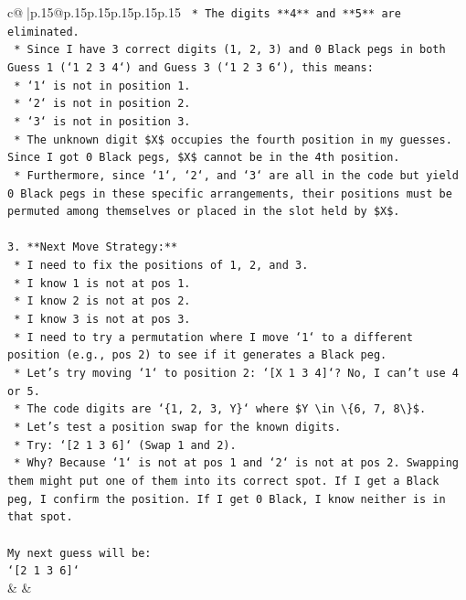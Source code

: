 \documentclass{article}
\begin{document}
{\begin{supertabular}{c@{$\;$}|p{.15\linewidth}@{}p{.15\linewidth}p{.15\linewidth}p{.15\linewidth}p{.15\linewidth}p{.15\linewidth}}
{{{\texttt{    *   The digits **4** and **5** are eliminated.} \\
\texttt{    *   Since I have 3 correct digits (1, 2, 3) and 0 Black pegs in both Guess 1 (`1 2 3 4`) and Guess 3 (`1 2 3 6`), this means:} \\
\texttt{        *   `1` is not in position 1.} \\
\texttt{        *   `2` is not in position 2.} \\
\texttt{        *   `3` is not in position 3.} \\
\texttt{    *   The unknown digit \$X\$ occupies the fourth position in my guesses. Since I got 0 Black pegs, \$X\$ cannot be in the 4th position.} \\
\texttt{    *   Furthermore, since `1`, `2`, and `3` are all in the code but yield 0 Black pegs in these specific arrangements, their positions must be permuted among themselves or placed in the slot held by \$X\$.} \\
\\ 
\texttt{3.  **Next Move Strategy:**} \\
\texttt{    *   I need to fix the positions of 1, 2, and 3.} \\
\texttt{    *   I know 1 is not at pos 1.} \\
\texttt{    *   I know 2 is not at pos 2.} \\
\texttt{    *   I know 3 is not at pos 3.} \\
\texttt{    *   I need to try a permutation where I move `1` to a different position (e.g., pos 2) to see if it generates a Black peg.} \\
\texttt{    *   Let's try moving `1` to position 2: `{[}X 1 3 4{]}`? No, I can't use 4 or 5.} \\
\texttt{    *   The code digits are `\{1, 2, 3, Y\}` where \$Y \textbackslash{}in \textbackslash{}\{6, 7, 8\textbackslash{}\}\$.} \\
\texttt{    *   Let's test a position swap for the known digits.} \\
\texttt{    *   Try: `{[}2 1 3 6{]}` (Swap 1 and 2).} \\
\texttt{    *   Why? Because `1` is not at pos 1 and `2` is not at pos 2. Swapping them might put one of them into its correct spot. If I get a Black peg, I confirm the position. If I get 0 Black, I know neither is in that spot.} \\
\\ 
\texttt{My next guess will be:} \\
\texttt{`{[}2 1 3 6{]}`} \\
            }
        }
    }
    & & \\ \\


\end{supertabular}}
\end{document}
